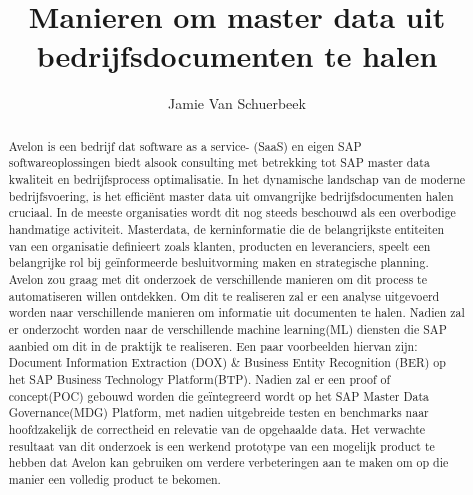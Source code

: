\documentclass{hogent-article}
\title{Manieren om master data uit bedrijfsdocumenten te halen}
\author{Jamie Van Schuerbeek}
\begin{document}
\begin{abstract}

Avelon is een bedrijf dat software as a service- (SaaS) en eigen SAP softwareoplossingen biedt alsook consulting met betrekking tot SAP master data kwaliteit en bedrijfsprocess optimalisatie. In het dynamische landschap van de moderne bedrijfsvoering, is het efficiënt master data uit omvangrijke bedrijfsdocumenten halen cruciaal. In de meeste organisaties wordt dit nog steeds beschouwd als een overbodige handmatige activiteit. Masterdata, de kerninformatie die de belangrijkste entiteiten van een organisatie definieert zoals klanten, producten en leveranciers, speelt een belangrijke rol bij geïnformeerde besluitvorming maken en strategische planning. Avelon zou graag met dit onderzoek de verschillende manieren om dit process te automatiseren willen ontdekken. Om dit te realiseren zal er een analyse uitgevoerd worden naar verschillende manieren om informatie uit documenten te halen. Nadien zal er onderzocht worden naar de verschillende machine learning(ML) diensten die SAP aanbied om dit in de praktijk te realiseren. Een paar voorbeelden hiervan zijn: Document Information Extraction (DOX) \& Business Entity Recognition (BER) op het SAP Business Technology Platform(BTP). Nadien zal er een proof of concept(POC) gebouwd worden die geïntegreerd wordt op het SAP Master Data Governance(MDG) Platform, met nadien uitgebreide testen en benchmarks naar hoofdzakelijk de correctheid en relevatie van de opgehaalde data. Het verwachte resultaat van dit onderzoek is een werkend prototype van een mogelijk product te hebben dat Avelon kan gebruiken om verdere verbeteringen aan te maken om op die manier een volledig product te bekomen.
\end{abstract}

\tableofcontents



\printbibliography[heading=bibintoc]
\end{document}

